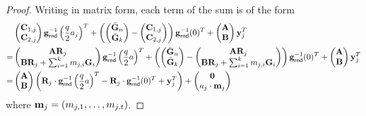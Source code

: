 \begin{proof}
    Writing in matrix form, each term of the sum is of the form  \begin{align*}
       &  \begin{pmatrix} \mathbf{C}_{1,j} \\ \mathbf{C}_{2,j}\end{pmatrix} \mathbf{g}^{-1}_\mathsf{rnd}\left(\frac{q}{2} a_j\right)^T+ \left( \begin{pmatrix} \bar {\mathbf{G}}_n \\ \bar {\mathbf{G}}_k\end{pmatrix} - \begin{pmatrix} \mathbf{C}_{1,j} \\ \mathbf{C}_{2,j}\end{pmatrix}\right) \mathbf{g}^{-1}_\mathsf{rnd}(0)^T +\begin{pmatrix}
\mathbf{A} \\ \mathbf{B} \\
\end{pmatrix}\mathbf{y}_j^T \\
= &
    \begin{pmatrix} \mathbf{A}\mathbf{R}_j \\ \mathbf{B}\mathbf{R}_j  + \sum _{i=1}^k m_{j,i} \mathbf{G}_i\end{pmatrix} \mathbf{g}^{-1}_\mathsf{rnd}\left(\frac{q}{2} a\right)^T+ \left( \begin{pmatrix} \bar {\mathbf{G}}_n \\ \bar {\mathbf{G}}_k\end{pmatrix} - \begin{pmatrix} \mathbf{A}\mathbf{R}_j \\ \mathbf{B}\mathbf{R}_j  + \sum_{i=1}^k m_{j,i}\mathbf{G}_i\end{pmatrix}\right) \mathbf{g}^{-1}_\mathsf{rnd}(0) ^T+\begin{pmatrix}
\mathbf{A} \\ \mathbf{B}
\end{pmatrix}\mathbf{y}_j^T \\ 
=&
    \begin{pmatrix} \mathbf{A} \\ \mathbf{B}\end{pmatrix}\left(\mathbf{R}_j\cdot \mathbf{g}^{-1}_\mathsf{rnd}\left(\frac{q}{2} a\right)^T - \mathbf{R}_j\cdot \mathbf{g}^{-1}_\mathsf{rnd}(0)^T + \mathbf{y}_j^T \right)+  \begin{pmatrix}
    \mathbf{0} \\ a_j\cdot\mathbf{m}_j
    \end{pmatrix}
    \end{align*} where $\mathbf{m}_j=(m_{j,1},\dots, m_{j,t})$. 
    

\end{proof}
